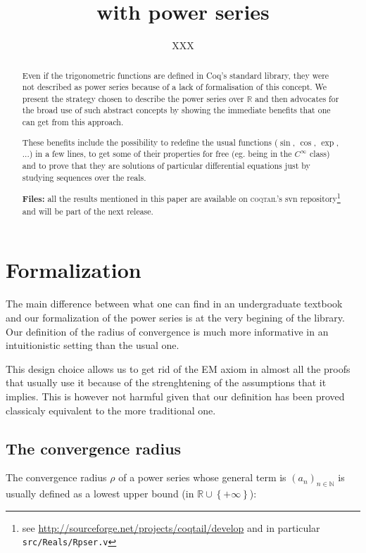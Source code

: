 \documentclass[submission,copyright]{eptcs}
\title{\coq{} with power series}
\author{XXX
\institute{Junior Laboratory \coqtail{}\\
Ens Lyon - France\\}
\email{XXX}}
\newcommand{\coq}{Coq}
\newcommand{\coqtail}{\textsc{coqtail}}
\newcommand{\N}{\mathbb{N}}
\newcommand{\R}{\mathbb{R}}
\begin{document}
\maketitle

\begin{abstract}
Even if the trigonometric functions are defined in \coq{}'s standard
library, they were not described as power series because of a lack of
formalisation of this concept.
We present the strategy chosen to describe the power series over $\R$
and then advocates for the broad use of such abstract concepts by
showing the immediate benefits that one can get from this approach.

These benefits include the possibility to redefine the usual functions
($\sin$, $\cos$, $\exp$, ...) in a few lines, to get some of their
properties for free (eg. being in the $C^{\infty}$ class) and to prove
that they are solutions of particular differential equations just by
studying sequences over the reals.

\textbf{Files:} all the results mentioned in this paper are available on
\coqtail{}'s svn repository\footnote{see \url{http://sourceforge.net/projects/coqtail/develop}
and in particular \texttt{src/Reals/Rpser.v}} and will
be part of the next release.

\end{abstract}

\section{Formalization}

The main difference between what one can find in an undergraduate textbook
and our formalization of the power series is at the very begining of the
library. Our definition of the radius of convergence is much more informative
in an intuitionistic setting than the usual one.

This design choice allows us to get rid of the EM axiom in almost all
the proofs that usually use it because of the strenghtening of the
assumptions that it implies. This is however not harmful given that our
definition has been proved classicaly equivalent to the more traditional
one.

\subsection{The convergence radius}

The convergence radius $\rho$ of a power series whose general term is
$(a_n)_{n \in \N}$ is usually defined as a lowest upper bound (in
$\R \cup \left\lbrace +\infty \right\rbrace$):
\end{document}
